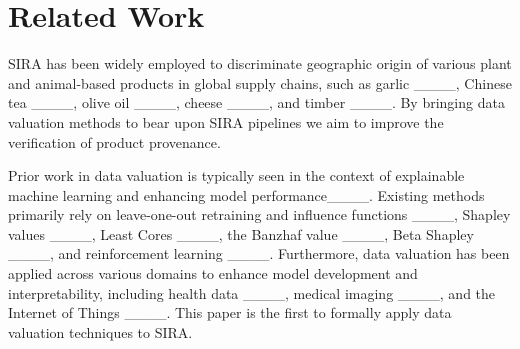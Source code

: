 \section{Related Work}
SIRA has been widely
employed to discriminate geographic origin of various
plant and animal-based products in global supply chains, such as garlic ____, Chinese tea ____, olive oil ____, cheese ____, and timber ____. 
By bringing data valuation methods to bear upon
SIRA pipelines we aim to improve
the verification of product provenance.

Prior work in data valuation is typically
seen in the context of explainable machine learning and enhancing model performance____. Existing methods primarily rely on leave-one-out retraining and influence functions ____, Shapley values ____, Least Cores ____, the Banzhaf value ____, Beta Shapley ____, and reinforcement learning ____. Furthermore, data valuation has been applied across various domains to enhance model development and interpretability, including health data ____, medical imaging ____, and the Internet of Things ____. This paper
is the first to formally apply data
valuation techniques to SIRA.
